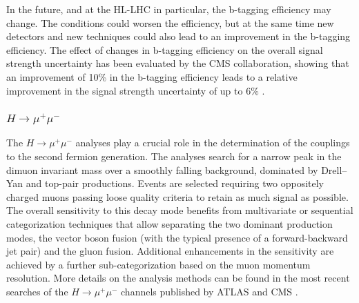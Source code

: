 In the future, and at the HL-LHC in particular, the b-tagging efficiency may change. The conditions could worsen the efficiency, but
at the same time new detectors and new techniques could also lead to an improvement in the b-tagging efficiency. 
The effect of changes in b-tagging efficiency on the overall signal strength uncertainty has been evaluated by the CMS collaboration, showing that an improvement of 10\% in the b-tagging efficiency leads to a relative improvement in the signal strength uncertainty of up to 6\% \cite{CMS-PAS-FTR-18-011}.
%


\subsubsection{$H \to \mu^{+}\mu^{-}$}
The  $H \to \mu^{+}\mu^{-}$ analyses play a crucial role in the determination of the couplings to the second fermion generation. The analyses search for a narrow peak in the dimuon invariant mass over a smoothly falling background, dominated by Drell--Yan and top-pair productions. Events are selected requiring two oppositely charged muons passing loose quality criteria to retain as much signal as possible. The overall sensitivity to this decay mode benefits from multivariate or sequential categorization techniques that allow separating the two dominant production modes, the vector boson fusion (with the typical presence of a forward-backward jet pair) and the gluon fusion. Additional enhancements in the sensitivity are achieved by a further sub-categorization based on the muon momentum resolution. More details on the analysis methods can be found in the most recent searches of the  $H \to \mu^{+}\mu^{-}$ channels published by ATLAS \cite{Aaboud:2017ojs} and CMS \cite{Sirunyan:2018hbu}.  

